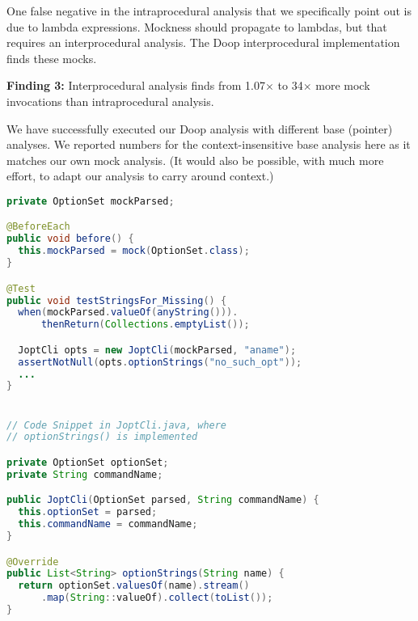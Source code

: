 One false negative in the intraprocedural analysis that we specifically point out is due to lambda expressions. Mockness should propagate to lambdas, but that requires an interprocedural analysis. The Doop interprocedural implementation finds these mocks.

\begin{mdframed}[
	leftmargin=\parindent,
	rightmargin=\parindent,
	skipabove=\topsep,
	skipbelow=\topsep
	]
	{\bf Finding 3:} Interprocedural analysis finds from 1.07$\times$ to 34$\times$ more mock invocations than intraprocedural analysis.
\end{mdframed}

We have successfully executed our Doop analysis with different base (pointer) analyses. We reported numbers for the context-insensitive base analysis here as it matches our own mock analysis. (It would also be possible, with much more effort, to adapt our analysis to carry around context.)

\begin{lstlisting}[basicstyle=\ttfamily, caption={Code snippet from boutique's \texttt{JoptCliTest}, which Doop's interprocedural implementation detect mock call in the callee \texttt{optionStrings}.},
basicstyle=\scriptsize\ttfamily,language = Java, framesep=4.5mm, escapechar=|,
framexleftmargin=1.0mm, captionpos=b, label=lis:boutiqueMockCall, morekeywords={@Test}]
private OptionSet mockParsed;

@BeforeEach
public void before() {
  this.mockParsed = mock(OptionSet.class);
}

@Test
public void testStringsFor_Missing() {
  when(mockParsed.valueOf(anyString())).
      thenReturn(Collections.emptyList());

  JoptCli opts = new JoptCli(mockParsed, "aname");
  assertNotNull(opts.optionStrings("no_such_opt"));
  ...
}


// Code Snippet in JoptCli.java, where 
// optionStrings() is implemented

private OptionSet optionSet;
private String commandName;

public JoptCli(OptionSet parsed, String commandName) {
  this.optionSet = parsed;
  this.commandName = commandName;
}

@Override
public List<String> optionStrings(String name) {
  return optionSet.valuesOf(name).stream()
      .map(String::valueOf).collect(toList());
}
\end{lstlisting}

